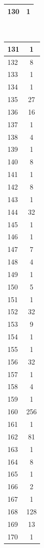\documentclass[10pt,twoside]{article}
\theoremstyle{definition}
\begin{document}
\begin{table}
\begin{center}
\begin{tabular}{|l|c|}
130 & 1 \\\hline
\end{tabular}
\,\,\,\,\,\,
\begin{tabular}{|l|c|}\hline
131 & 1 \\\hline
132 & 8 \\\hline
133 & 1 \\\hline
134 & 1 \\\hline
135 & 27 \\\hline
136 & 16 \\\hline
137 & 1 \\\hline
138 & 4 \\\hline
139 & 1 \\\hline
140 & 8 \\\hline
141 & 1 \\\hline
142 & 8 \\\hline
143 & 1 \\\hline
144 & 32 \\\hline
145 & 1 \\\hline
146 & 1 \\\hline
147 & 7 \\\hline
148 & 4 \\\hline
149 & 1 \\\hline
150 & 5 \\\hline
151 & 1 \\\hline
152 & 32 \\\hline
153 & 9 \\\hline
154 & 1 \\\hline
155 & 1 \\\hline
156 & 32 \\\hline
157 & 1 \\\hline
158 & 4 \\\hline
159 & 1 \\\hline
160 & 256 \\\hline
161 & 1 \\\hline
162 & 81 \\\hline
163 & 1 \\\hline
164 & 8 \\\hline
165 & 1 \\\hline
166 & 2 \\\hline
167 & 1 \\\hline
168 & 128 \\\hline
169 & 13 \\\hline
170 & 1 \\\hline
\end{tabular}
\,\,\,\,\,\,
\begin{tabular}{|l|c|}\hline

\end{tabular}
\end{center}
\end{table}
\end{document}
